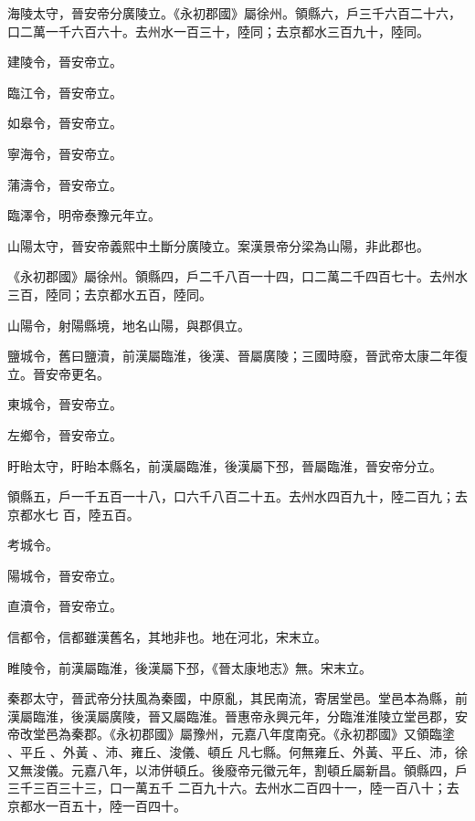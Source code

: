 \begin{pinyinscope}
 海陵太守，晉安帝分廣陵立。《永初郡國》屬徐州。領縣六，戶三千六百二十六，口二萬一千六百六十。去州水一百三十，陸同；去京都水三百九十，陸同。



 建陵令，晉安帝立。



 臨江令，晉安帝立。



 如皋令，晉安帝立。



 寧海令，晉安帝立。



 蒲濤令，晉安帝立。



 臨澤令，明帝泰豫元年立。



 山陽太守，晉安帝義熙中土斷分廣陵立。案漢景帝分梁為山陽，非此郡也。



 《永初郡國》屬徐州。領縣四，戶二千八百一十四，口二萬二千四百七十。去州水三百，陸同；去京都水五百，陸同。



 山陽令，射陽縣境，地名山陽，與郡俱立。



 鹽城令，舊曰鹽瀆，前漢屬臨淮，後漢、晉屬廣陵；三國時廢，晉武帝太康二年復立。晉安帝更名。



 東城令，晉安帝立。



 左鄉令，晉安帝立。



 盱眙太守，盱眙本縣名，前漢屬臨淮，後漢屬下邳，晉屬臨淮，晉安帝分立。



 領縣五，戶一千五百一十八，口六千八百二十五。去州水四百九十，陸二百九；去京都水七
 百，陸五百。


考城令。



 陽城令，晉安帝立。



 直瀆令，晉安帝立。



 信都令，信都雖漢舊名，其地非也。地在河北，宋末立。



 睢陵令，前漢屬臨淮，後漢屬下邳，《晉太康地志》無。宋末立。


秦郡太守，晉武帝分扶風為秦國，中原亂，其民南流，寄居堂邑。堂邑本為縣，前漢屬臨淮，後漢屬廣陵，晉又屬臨淮。晉惠帝永興元年，分臨淮淮陵立堂邑郡，安帝改堂邑為秦郡。《永初郡國》屬豫州，元嘉八年度南兗。《永初郡國》又領臨塗
 、平丘
 、外黃
 、沛、雍丘、浚儀、頓丘
 凡七縣。何無雍丘、外黃、平丘、沛，徐又無浚儀。元嘉八年，以沛併頓丘。後廢帝元徽元年，割頓丘屬新昌。領縣四，戶三千三百三十三，口一萬五千
 二百九十六。去州水二百四十一，陸一百八十；去京都水一百五十，陸一百四十。




\end{pinyinscope}
